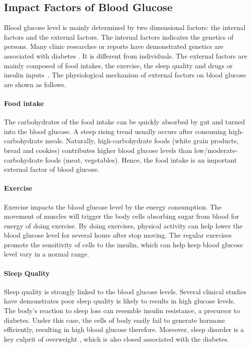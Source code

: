 \subsection{Impact Factors of Blood Glucose}
 Blood glucose level is mainly determined by two dimensional factors:  the internal factors and the external factors. The internal factors indicates the genetics of persons. Many clinic researches or reports have demonstrated genetics are associated with diabetes \cite{bib:simpson1978genetics,bib:diabetes_co_uk,bib:rotter1984genetics,bib:concannon2009genetics,bib:salopuro2004common}.
 It is different from individuals. The external factors are mainly composed of food intakes, the exercise, the sleep quality and drugs or insulin inputs~\cite{bib:duke2010intelligent}. The physiological mechanism of external factors on blood glucose are shown as follows.

\paragraph{Food intake} The carbohydrates of the food intake can be quickly absorbed by gut and turned into the blood glucose. A steep rising trend usually occurs after consuming high-carbohydrate meals. Naturally, high-carbohydrate foods (\eg white grain products, bread and cookies) contributes higher blood glucose levels than low/moderate-carbohydrate foods (\eg meat, vegetables).
Hence, the food intake is an important external factor of blood glucose.
\paragraph{Exercise} Exercise impacts the blood glucose level by the energy consumption. The movement of muscles will trigger the body cells absorbing sugar from blood for energy of doing exercise.  By doing exercises, physical activity can help lower the blood glucose level for several hours after stop moving. The regular exercises promote the sensitivity of cells to the insulin, which can help keep blood glucose level vary in a normal range.

\paragraph{Sleep Quality} Sleep quality is strongly linked to the blood glucose levels. Several clinical studies \cite{bib:scheen1998roles,bib:scheen1996relationships,bib:spiegel2005sleep} have demonstrates poor sleep quality is likely to results in high glucose levels. The body's reaction to sleep loss can resemble insulin resistance, a precursor to diabetes. Under this case, the cells of body easily fail to generate hormone efficiently, resulting in high blood glucose therefore. Moreover, sleep disorder is a key culprit of overweight \cite{bib:punjabi2002sleep, bib:knutson2006role}, which is also closed associated with the diabetes.


